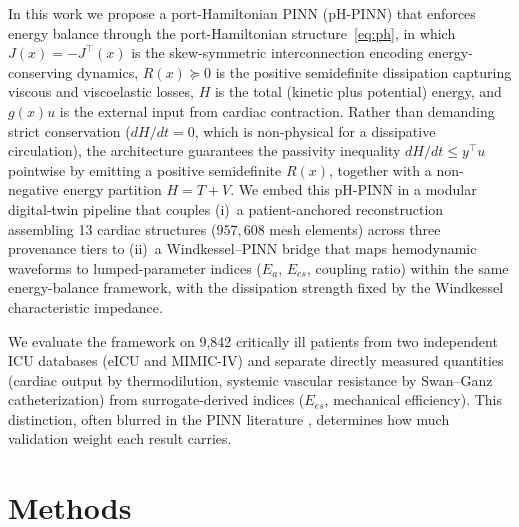 \documentclass[journal]{IEEEtran}
\begin{document}
In this work we propose a port-Hamiltonian PINN (pH-PINN) that enforces energy balance through the port-Hamiltonian structure~\eqref{eq:ph}, in which $J(x)=-J^{\top}(x)$ is the skew-symmetric interconnection encoding energy-conserving dynamics, $R(x)\succeq 0$ is the positive semidefinite dissipation capturing viscous and viscoelastic losses, $H$ is the total (kinetic plus potential) energy, and $g(x)u$ is the external input from cardiac contraction. Rather than demanding strict conservation ($dH/dt=0$, which is non-physical for a dissipative circulation), the architecture guarantees the passivity inequality $dH/dt\le y^{\top}u$ pointwise by emitting a positive semidefinite $R(x)$, together with a non-negative energy partition $H=T+V$. We embed this pH-PINN in a modular digital-twin pipeline that couples (i)~a patient-anchored reconstruction assembling 13 cardiac structures ($957{,}608$ mesh elements) across three provenance tiers to (ii)~a Windkessel--PINN bridge that maps hemodynamic waveforms to lumped-parameter indices ($E_a$, $E_{es}$, coupling ratio) within the same energy-balance framework, with the dissipation strength fixed by the Windkessel characteristic impedance.

We evaluate the framework on 9{,}842 critically ill patients from two independent ICU databases (eICU and MIMIC-IV) and separate directly measured quantities (cardiac output by thermodilution, systemic vascular resistance by Swan--Ganz catheterization) from surrogate-derived indices ($E_{es}$, mechanical efficiency). This distinction, often blurred in the PINN literature \cite{karniadakis2021,kissas2020}, determines how much validation weight each result carries.


\section{Methods}\label{sec:methods}
\end{document}
